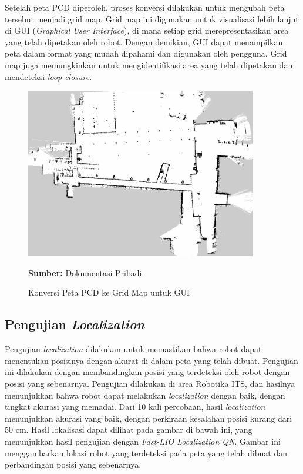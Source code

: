 Setelah peta PCD diperoleh, proses konversi dilakukan untuk mengubah peta tersebut menjadi grid map. Grid map ini digunakan untuk visualisasi lebih lanjut di GUI (\emph{Graphical User Interface}), di mana setiap grid merepresentasikan area yang telah dipetakan oleh robot. Dengan demikian, GUI dapat menampilkan peta dalam format yang mudah dipahami dan digunakan oleh pengguna. Grid map juga memungkinkan untuk mengidentifikasi area yang telah dipetakan dan mendeteksi \emph{loop closure}.

\begin{figure}[H]
    \centering
    \includegraphics[width=0.9\textwidth]{gambar/bab4/pgridm-map.png}
    \caption{Konversi Peta PCD ke Grid Map untuk GUI}
    \footnotesize{\textbf{Sumber:} Dokumentasi Pribadi}
    \label{fig:grid_map}
\end{figure}

\subsection{Pengujian \emph{Localization}}

Pengujian \emph{localization} dilakukan untuk memastikan bahwa robot dapat menentukan posisinya dengan akurat di dalam peta yang telah dibuat. Pengujian ini dilakukan dengan membandingkan posisi yang terdeteksi oleh robot dengan posisi yang sebenarnya. Pengujian dilakukan di area Robotika ITS, dan hasilnya menunjukkan bahwa robot dapat melakukan \emph{localization} dengan baik, dengan tingkat akurasi yang memadai. Dari 10 kali percobaan, hasil \emph{localization} menunjukkan akurasi yang baik, dengan perkiraan kesalahan posisi kurang dari 50 cm. Hasil lokalisasi dapat dilihat pada gambar di bawah ini, yang menunjukkan hasil pengujian dengan \emph{Fast-LIO Localization QN}. Gambar ini menggambarkan lokasi robot yang terdeteksi pada peta yang telah dibuat dan perbandingan posisi yang sebenarnya.

